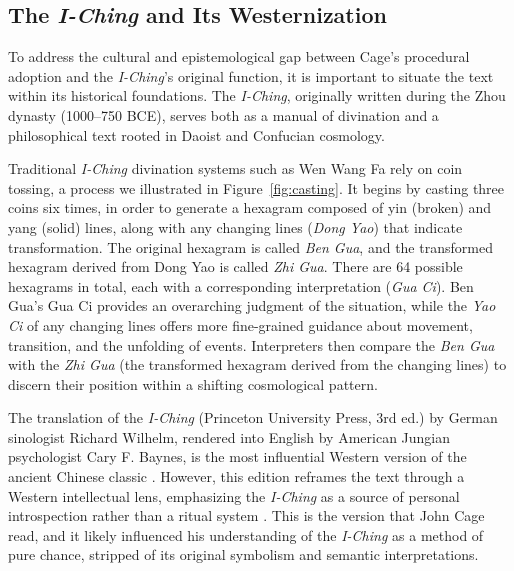 \documentclass{article}
\begin{document}
\subsection{The \textit{I-Ching} and Its Westernization}\label{subsec:iching}
To address the cultural and epistemological gap between Cage’s procedural adoption and the \textit{I-Ching}’s original function, it is important to situate the text within its historical foundations. 
The \textit{I-Ching}, originally written during the Zhou dynasty (1000--750 BCE), serves both as a manual of divination and a philosophical text rooted in Daoist and Confucian cosmology.


Traditional \textit{I-Ching} divination systems such as Wen Wang Fa rely on coin tossing, a process we illustrated in Figure~\ref{fig:casting}. It begins by casting three coins six times, in order to generate a hexagram composed of yin (broken) and yang (solid) lines, along with any changing lines (\textit{Dong Yao}) that indicate transformation.
The original hexagram is called \textit{Ben Gua}, and the transformed hexagram derived from Dong Yao is called \textit{Zhi Gua}.
There are 64 possible hexagrams in total, each with a corresponding interpretation (\textit{Gua Ci}).
Ben Gua's Gua Ci provides an overarching judgment of the situation, while the \textit{Yao Ci} of any changing lines offers more fine-grained guidance about movement, transition, and the unfolding of events.
Interpreters then compare the \textit{Ben Gua} with the \textit{Zhi Gua} (the transformed hexagram derived from the changing lines) to discern their position within a shifting cosmological pattern. 

The translation of the \textit{I-Ching} (Princeton University Press, 3rd ed.) by German sinologist Richard Wilhelm, rendered into English by American Jungian psychologist Cary F. Baynes, is the most influential Western version of the ancient Chinese classic \cite{yijingWilhelm}. 
However, this edition reframes the text through a Western intellectual lens, emphasizing the \textit{I-Ching} as a source of personal introspection rather than a ritual system \cite{smith2012book}. 
This is the version that John Cage read, and it likely influenced his understanding of the \textit{I-Ching} as a method of pure chance, stripped of its original symbolism and semantic interpretations. 
\end{document}
